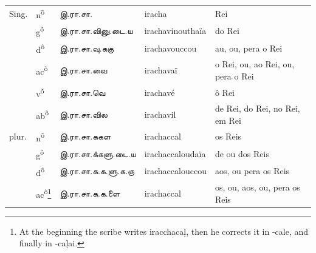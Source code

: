 \documentclass[12pt,a4paper]{scrbook}
\begin{document}
      
\begin{tabular}{lllll}
    
        
          Sing. &
          n\textsuperscript{õ} &
          இ.ரா.சா. &
          iracha &
          Rei \\
    
        
    
        
           &
          g\textsuperscript{õ} &
          இ.ரா.சா.வினு.டை.ய &
          irachavinouthaïa &
          do Rei \\
    
        
    
        
           &
          d\textsuperscript{õ} &
          இ.ரா.சா.வு.ககு &
          irachavouccou &
          au, ou, pera o Rei \\
    
        
    
        
           &
          ac\textsuperscript{õ} &
          இ.ரா.சா.வை &
          irachavaï &
          o Rei, ou, ao Rei, ou, pera o Rei \\
    
        
    
        
           &
          v\textsuperscript{õ} &
          இ.ரா.சா.வெ &
          irachavé &
          ô Rei \\
    
        
    
        
           &
          ab\textsuperscript{õ} &
          இ.ரா.சா.வில &
          irachavil  &
          de Rei, do Rei, no Rei, em Rei \\
    
        
    
        
          plur. &
          n\textsuperscript{õ} &
          இ.ரா.சா.ககள &
          irachaccal &
          os Reis \\
    
        
    
        
           &
          g\textsuperscript{õ} &
          இ.ரா.சா.க்களு.டை.ய &
          irachaccaloudaïa  &
          de ou dos Reis \\
    
        
    
        
           &
          d\textsuperscript{õ} &
          இ.ரா.சா.க.க.ளு.க.கு &
          irachaccalouccou &
          aos, ou pera os Reis \\
    
        
    
        
           &
          ac\textsuperscript{õ}\footnote{At the beginning the scribe writes iracchacaḷ, then he corrects it in -cale, and finally in -caḷai.} &
          இ.ரா.சா.க.க.ளை &
          irachaccal &
          os, ou, aos, ou, pera os Reis \\
    

\end{tabular}
\end{document}

